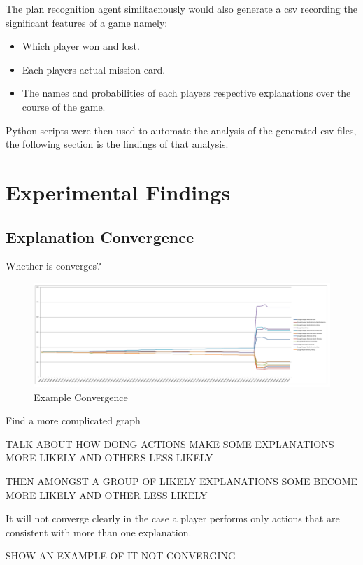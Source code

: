 \documentclass[parskip]{cs4rep}
\begin{document}
The plan recognition agent similtaenously would also generate a csv recording the significant features of a game namely:

\begin{itemize}
\item
Which player won and lost.
\item
Each players actual mission card.
\item
The names and probabilities of each players respective explanations over the course of the game.
\end{itemize}

Python scripts were then used to automate the analysis of the generated csv files, the following section is the findings of that analysis. 

\section{Experimental Findings}

\subsection{Explanation Convergence}

Whether is converges?

\begin{figure}[h]
\centerline{
\includegraphics{images/example-good-convergence}
}
\caption{Example Convergence}
\label{fig:example-good-convergence}
\end{figure} 

Find a more complicated graph

TALK ABOUT HOW DOING ACTIONS MAKE SOME EXPLANATIONS MORE LIKELY AND OTHERS LESS LIKELY

THEN AMONGST A GROUP OF LIKELY EXPLANATIONS SOME BECOME MORE LIKELY AND OTHER LESS LIKELY

It will not converge clearly in the case a player performs only actions that are consistent with more than one explanation.

SHOW AN EXAMPLE OF IT NOT CONVERGING
\end{document}
